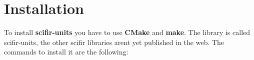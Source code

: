 \chapter{Installation}
\hypertarget{md_INSTALL}{}\label{md_INSTALL}
\label{md_INSTALL_autotoc_md4}%
%
 To install {\bfseries{scifir-\/units}} you have to use {\bfseries{CMake}} and {\bfseries{make}}. The library is called scifir-\/units, the other scifir libraries aren\textquotesingle{}t yet published in the web. The commands to install it are the following\+:


\begin{DoxyCode}{0}

\end{DoxyCode}
 